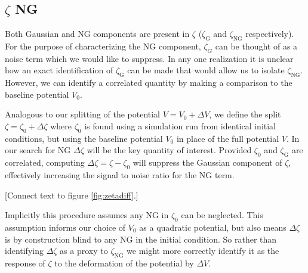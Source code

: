 




\subsection{$\zeta$ NG} \label{sec:zeta ng}

Both Gaussian and NG components are present in $\zeta$ ($\zeta_\mathrm{G}$ and $\zeta_\mathrm{NG}$ respectively).
For the purpose of characterizing the NG component, $\zeta_G$ can be thought of as a noise term which we would like to suppress.
In any one realization it is unclear how an exact identification of $\zeta_\mathrm{G}$ can be made that would allow us to isolate $\zeta_\mathrm{NG}$.
However, we can identify a correlated quantity by making a comparison to the baseline potential $V_0$.

Analogous to our splitting of the potential $V = V_0 + \Delta V$, we define the split $\zeta = \zeta_0 + \Delta\zeta$ where $\zeta_0$ is found using a simulation run from identical initial conditions, but using the baseline potential $V_0$ in place of the full potential $V$.
In our search for NG $\Delta\zeta$ will be the key quantity of interest.
Provided $\zeta_0$ and $\zeta_\mathrm{G}$ are correlated, computing $\Delta\zeta = \zeta - \zeta_0$ will suppress the Gaussian component of $\zeta$, effectively increasing the signal to noise ratio for the NG term.

[Connect text to figure \ref{fig:zetadiff}.]

Implicitly this procedure assumes any NG in $\zeta_0$ can be neglected.
This assumption informs our choice of $V_0$ as a quadratic potential, but also means $\Delta\zeta$ is by construction blind to any NG in the initial condition.
So rather than identifying $\Delta\zeta$ as a proxy to $\zeta_\mathrm{NG}$ we might more correctly identify it as the response of $\zeta$ to the deformation of the potential by $\Delta V$.

